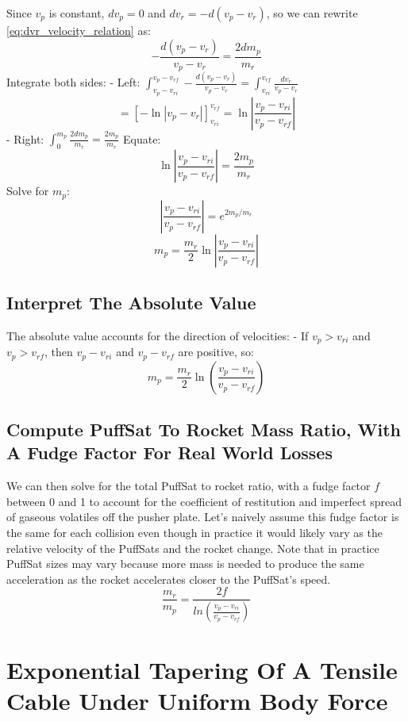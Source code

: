 \documentclass{article}
\begin{document}
Since \(v_p\) is constant,  \(dv_p = 0\) and  \(dv_r = -d(v_p-v_r)\), so we can rewrite \autoref{eq:dvr_velocity_relation} as:
\[
-\frac{d(v_p - v_r)}{v_p - v_r} = \frac{2 dm_p}{m_r}
\]
Integrate both sides:
- Left: \( \int_{v_p - v_{ri}}^{v_p - v_{rf}} -\frac{d(v_p - v_r)}{v_p - v_r} = \int_{v_{ri}}^{v_{rf}} \frac{dv_r}{v_p - v_r} \)
\[
= \left[ -\ln|v_p - v_r| \right]_{v_{ri}}^{v_{rf}} = \ln \left| \frac{v_p - v_{ri}}{v_p - v_{rf}} \right|
\]
- Right: \( \int_0^{m_p} \frac{2 dm_p}{m_r} = \frac{2 m_p}{m_r} \)
Equate:
\[
\ln \left| \frac{v_p - v_{ri}}{v_p - v_{rf}} \right| = \frac{2 m_p}{m_r}
\]
Solve for \( m_p \):
\[
\left| \frac{v_p - v_{ri}}{v_p - v_{rf}} \right| = e^{2 m_p / m_r}
\]
\begin{equation}
m_p = \frac{m_r}{2} \ln \left| \frac{v_p - v_{ri}}{v_p - v_{rf}} \right| 
\end{equation}
\subsection{Interpret The Absolute Value}   
The absolute value accounts for the direction of velocities:
- If \( v_p > v_{ri} \) and \( v_p > v_{rf} \),  then \( v_p - v_{ri} \) and \( v_p - v_{rf} \) are positive, so:
\[
m_p = \frac{m_r}{2} \ln \left( \frac{v_p - v_{ri}}{v_p - v_{rf}} \right)
\]
\subsection{Compute PuffSat To Rocket Mass Ratio, With A Fudge Factor For Real World Losses}

We can then solve for the total PuffSat to rocket ratio, with a fudge factor $f$ between 0 and 1 to account for the coefficient of restitution and imperfect spread of gaseous volatiles off the pusher plate.   Let's naively assume this fudge factor is the same for each collision even though in practice it would likely vary as the relative velocity of the PuffSats and the rocket change.  Note that in practice PuffSat sizes may vary because more mass is needed to produce the same acceleration as the rocket accelerates closer to the PuffSat's speed.
\begin{equation}
\frac{m_r}{m_p} = \frac{2f}{ln(\frac{v_p-v_{ri}}{v_p-v_{rf}})}\label{eq:PuffSat_ratio}
\end{equation}

\section{Exponential Tapering Of A Tensile Cable Under Uniform Body Force}\label{sec:breaking_length_derived}
\end{document}
